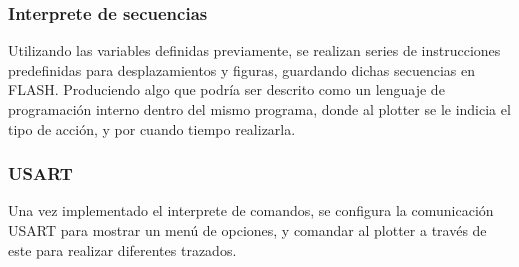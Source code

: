 \subsubsection{Interprete de secuencias}
Utilizando las variables definidas previamente, se realizan series de instrucciones predefinidas para desplazamientos y figuras, guardando dichas secuencias en FLASH. Produciendo algo que podría ser descrito como un lenguaje de programación interno dentro del mismo programa, donde al plotter se le indicia el tipo de acción, y por cuando tiempo realizarla.

\subsubsection{USART}
Una vez implementado el interprete de comandos, se configura la comunicación USART para mostrar un menú de opciones, y comandar al plotter a través de este para realizar diferentes trazados.


